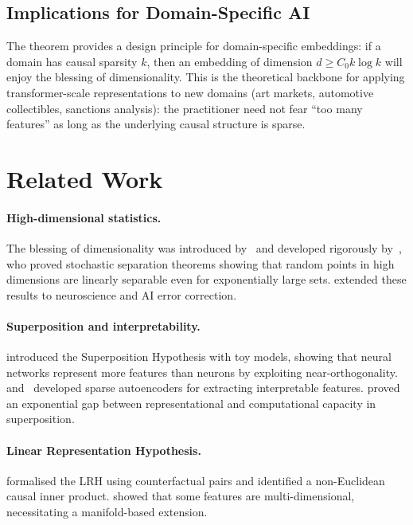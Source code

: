 \documentclass[11pt,a4paper]{article}
\theoremstyle{plain}
\theoremstyle{definition}
\theoremstyle{remark}
\begin{document}
\subsection{Implications for Domain-Specific AI}\label{sec:domain-specific}

The theorem provides a design principle for domain-specific embeddings: if a
domain has causal sparsity $k$, then an embedding of dimension
$d \geq C_0 k\log k$ will enjoy the blessing of dimensionality.  This is the
theoretical backbone for applying transformer-scale representations to new
domains (art markets, automotive collectibles, sanctions analysis): the
practitioner need not fear ``too many features'' as long as the underlying causal
structure is sparse.


\section{Related Work}\label{sec:related}

\paragraph{High-dimensional statistics.}
The blessing of dimensionality was introduced
by~\citet{donoho2000high} and developed rigorously
by~\citet{gorban2018blessing}, who proved stochastic separation theorems showing
that random points in high dimensions are linearly separable even for
exponentially large sets.  \citet{gorban2020blessing} extended these results to
neuroscience and AI error correction.

\paragraph{Superposition and interpretability.}
\citet{elhage2022superposition} introduced the Superposition Hypothesis with toy
models, showing that neural networks represent more features than neurons by
exploiting near-orthogonality.  \citet{bricken2023monosemanticity}
and~\citet{templeton2024scaling} developed sparse autoencoders for extracting
interpretable features.  \citet{adler2024complexity} proved an exponential gap
between representational and computational capacity in superposition.

\paragraph{Linear Representation Hypothesis.}
\citet{park2024linear} formalised the LRH using counterfactual pairs and
identified a non-Euclidean causal inner product.  \citet{engels2025not} showed
that some features are multi-dimensional, necessitating a manifold-based
extension.
\end{document}
